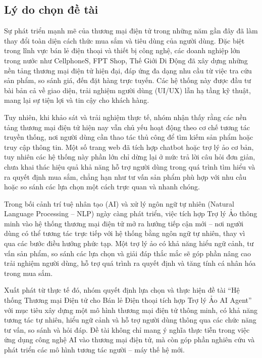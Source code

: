 \subsection{Lý do chọn đề tài}
Sự phát triển mạnh mẽ của thương mại điện tử trong những năm gần đây đã làm thay đổi toàn diện cách thức mua sắm và tiêu dùng của người dùng. Đặc biệt trong lĩnh vực bán lẻ điện thoại và thiết bị công nghệ, các doanh nghiệp lớn trong nước như CellphoneS, FPT Shop, Thế Giới Di Động đã xây dựng những nền tảng thương mại điện tử hiện đại, đáp ứng đa dạng nhu cầu từ việc tra cứu sản phẩm, so sánh giá, đến đặt hàng trực tuyến. Các hệ thống này được đầu tư bài bản cả về giao diện, trải nghiệm người dùng (UI/UX) lẫn hạ tầng kỹ thuật, mang lại sự tiện lợi và tin cậy cho khách hàng.

Tuy nhiên, khi khảo sát và trải nghiệm thực tế, nhóm nhận thấy rằng các nền tảng thương mại điện tử hiện nay vẫn chủ yếu hoạt động theo cơ chế tương tác truyền thống, nơi người dùng cần thao tác thủ công để tìm kiếm sản phẩm hoặc truy cập thông tin. Một số trang web đã tích hợp chatbot hoặc trợ lý ảo cơ bản, tuy nhiên các hệ thống này phần lớn chỉ dừng lại ở mức trả lời câu hỏi đơn giản, chưa khai thác hiệu quả khả năng hỗ trợ người dùng trong quá trình tìm hiểu và ra quyết định mua sắm, chẳng hạn như tư vấn sản phẩm phù hợp với nhu cầu hoặc so sánh các lựa chọn một cách trực quan và nhanh chóng.

Trong bối cảnh trí tuệ nhân tạo (AI) và xử lý ngôn ngữ tự nhiên (Natural Language Processing – NLP) ngày càng phát triển, việc tích hợp Trợ lý Ảo thông minh vào hệ thống thương mại điện tử mở ra hướng tiếp cận mới – nơi người dùng có thể tương tác trực tiếp với hệ thống bằng ngôn ngữ tự nhiên, thay vì qua các bước điều hướng phức tạp. Một trợ lý ảo có khả năng hiểu ngữ cảnh, tư vấn sản phẩm, so sánh các lựa chọn và giải đáp thắc mắc sẽ góp phần nâng cao trải nghiệm người dùng, hỗ trợ quá trình ra quyết định và tăng tính cá nhân hóa trong mua sắm.

Xuất phát từ thực tế đó, nhóm quyết định lựa chọn và thực hiện đề tài “Hệ thống Thương mại Điện tử cho Bán lẻ Điện thoại tích hợp Trợ lý Ảo AI Agent” với mục tiêu xây dựng một mô hình thương mại điện tử thông minh, có khả năng tương tác tự nhiên, hiểu ngữ cảnh và hỗ trợ người dùng thông qua các chức năng tư vấn, so sánh và hỏi đáp. Đề tài không chỉ mang ý nghĩa thực tiễn trong việc ứng dụng công nghệ AI vào thương mại điện tử, mà còn góp phần nghiên cứu và phát triển các mô hình tương tác người – máy thế hệ mới.